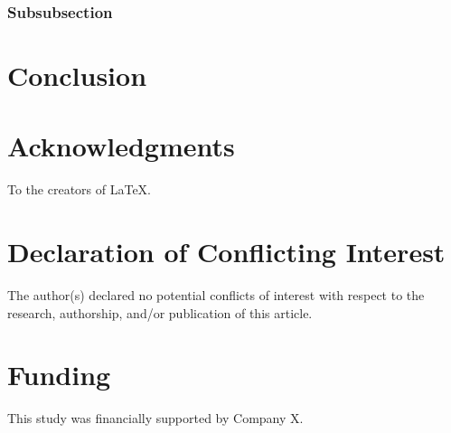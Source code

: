 \documentclass[fleqn,10pt]{JLA_article} %
\begin{document}
\subsubsection{Subsubsection}

\lipsum[14] %

\section{Conclusion}

\lipsum[15] %

\section*{Acknowledgments} %

To the creators of  \LaTeX.


\section*{Declaration of Conflicting Interest} %


The author(s) declared no potential conflicts of interest with respect to the research, authorship, and/or publication of this article.

\section*{Funding} %


This study was financially supported by Company X.



\end{document}
